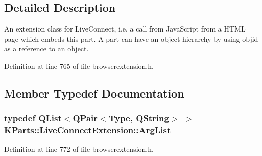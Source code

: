 \subsection{Detailed Description}
An extension class for Live\+Connect, i.\+e. a call from Java\+Script from a H\+T\+M\+L page which embeds this part. A part can have an object hierarchy by using objid as a reference to an object. 

Definition at line 765 of file browserextension.\+h.



\subsection{Member Typedef Documentation}
\hypertarget{classKParts_1_1LiveConnectExtension_a16a7a582605755e47eaab5b37e73d8cb}{
\subsubsection[{Arg\+List}]{\setlength{\rightskip}{0pt plus 5cm}typedef {\bf Q\+List}$<${\bf Q\+Pair}$<${\bf Type}, Q\+String$>$ $>$ {\bf K\+Parts\+::\+Live\+Connect\+Extension\+::\+Arg\+List}}}\label{classKParts_1_1LiveConnectExtension_a16a7a582605755e47eaab5b37e73d8cb}


Definition at line 772 of file browserextension.\+h.



